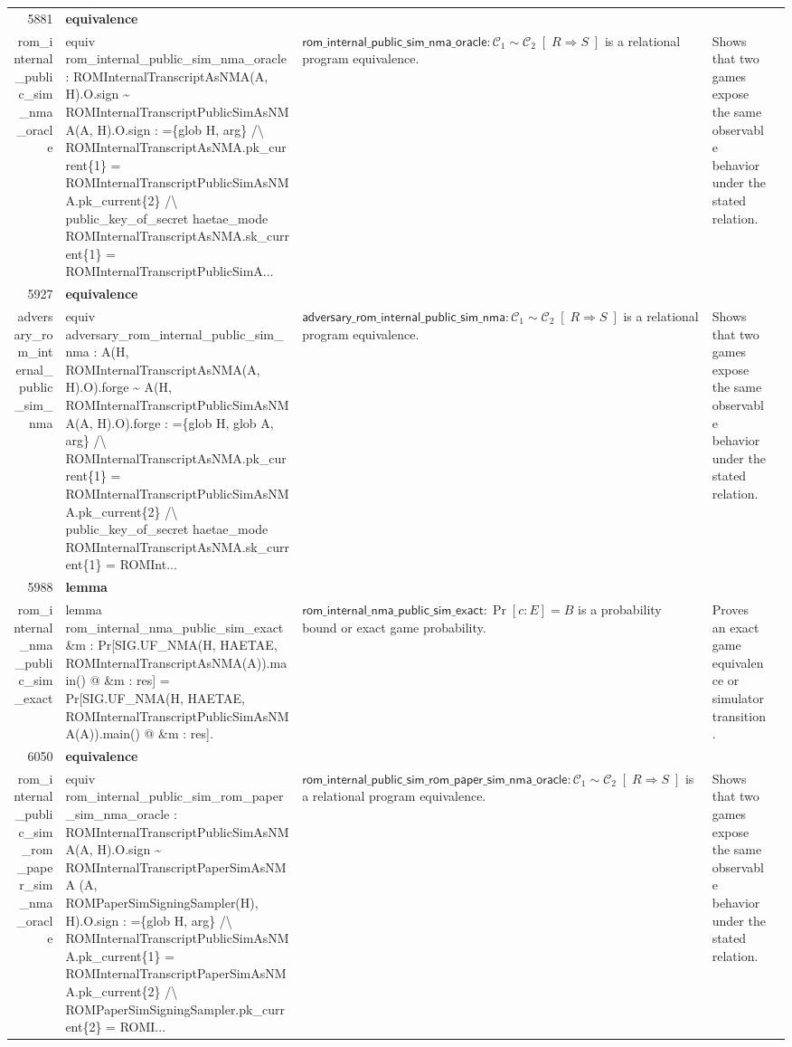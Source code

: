 \documentclass[10pt]{article}
\newcommand{\ec}[1]{\begingroup\ttfamily\scriptsize #1\endgroup}
\begin{document}
\begin{longtable}{r L{0.17\textwidth} L{0.26\textwidth} L{0.27\textwidth} L{0.20\textwidth}}
5881 & \textbf{equivalence}\\\ec{rom\_internal\_public\_sim\_nma\_oracle} & \ec{equiv rom\_internal\_public\_sim\_nma\_oracle : ROMInternalTranscriptAsNMA(A, H).O.sign \textasciitilde{} ROMInternalTranscriptPublicSimAsNMA(A, H).O.sign : =\{glob H, arg\} /\textbackslash{} ROMInternalTranscriptAsNMA.pk\_current\{1\} = ROMInternalTranscriptPublicSimAsNMA.pk\_current\{2\} /\textbackslash{} public\_key\_of\_secret haetae\_mode ROMInternalTranscriptAsNMA.sk\_current\{1\} = ROMInternalTranscriptPublicSimA...} & \(\mathsf{rom\_internal\_public\_sim\_nma\_oracle} : \mathcal{C}_1 \sim \mathcal{C}_2 \;[\;R \Rightarrow S\;]\) is a relational program equivalence. & Shows that two games expose the same observable behavior under the stated relation. \\
5927 & \textbf{equivalence}\\\ec{adversary\_rom\_internal\_public\_sim\_nma} & \ec{equiv adversary\_rom\_internal\_public\_sim\_nma : A(H, ROMInternalTranscriptAsNMA(A, H).O).forge \textasciitilde{} A(H, ROMInternalTranscriptPublicSimAsNMA(A, H).O).forge : =\{glob H, glob A, arg\} /\textbackslash{} ROMInternalTranscriptAsNMA.pk\_current\{1\} = ROMInternalTranscriptPublicSimAsNMA.pk\_current\{2\} /\textbackslash{} public\_key\_of\_secret haetae\_mode ROMInternalTranscriptAsNMA.sk\_current\{1\} = ROMInt...} & \(\mathsf{adversary\_rom\_internal\_public\_sim\_nma} : \mathcal{C}_1 \sim \mathcal{C}_2 \;[\;R \Rightarrow S\;]\) is a relational program equivalence. & Shows that two games expose the same observable behavior under the stated relation. \\
5988 & \textbf{lemma}\\\ec{rom\_internal\_nma\_public\_sim\_exact} & \ec{lemma rom\_internal\_nma\_public\_sim\_exact \&m : Pr[SIG.UF\_NMA(H, HAETAE, ROMInternalTranscriptAsNMA(A)).main() @ \&m : res] = Pr[SIG.UF\_NMA(H, HAETAE, ROMInternalTranscriptPublicSimAsNMA(A)).main() @ \&m : res].} & \(\mathsf{rom\_internal\_nma\_public\_sim\_exact} : \Pr[c : E] = B\) is a probability bound or exact game probability. & Proves an exact game equivalence or simulator transition. \\
6050 & \textbf{equivalence}\\\ec{rom\_internal\_public\_sim\_rom\_paper\_sim\_nma\_oracle} & \ec{equiv rom\_internal\_public\_sim\_rom\_paper\_sim\_nma\_oracle : ROMInternalTranscriptPublicSimAsNMA(A, H).O.sign \textasciitilde{} ROMInternalTranscriptPaperSimAsNMA (A, ROMPaperSimSigningSampler(H), H).O.sign : =\{glob H, arg\} /\textbackslash{} ROMInternalTranscriptPublicSimAsNMA.pk\_current\{1\} = ROMInternalTranscriptPaperSimAsNMA.pk\_current\{2\} /\textbackslash{} ROMPaperSimSigningSampler.pk\_current\{2\} = ROMI...} & \(\mathsf{rom\_internal\_public\_sim\_rom\_paper\_sim\_nma\_oracle} : \mathcal{C}_1 \sim \mathcal{C}_2 \;[\;R \Rightarrow S\;]\) is a relational program equivalence. & Shows that two games expose the same observable behavior under the stated relation. \\

\end{longtable}
\end{document}
